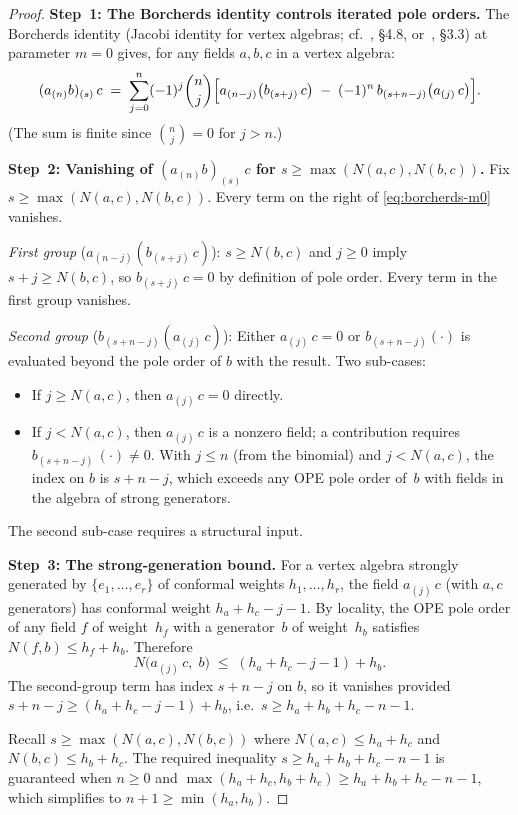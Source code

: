 \begin{proof}
\textbf{Step~1: The Borcherds identity controls iterated pole orders.}
The Borcherds identity (Jacobi identity for vertex algebras;
cf.~\cite{Kac98}, \S4.8, or~\cite{FBZ04}, \S3.3) at parameter $m=0$ gives,
for any fields $a,b,c$ in a vertex algebra:
\begin{equation}\label{eq:borcherds-m0}
(a_{(n)}b)_{(s)}\,c
\;=\;
\sum_{j=0}^{n}(-1)^j\binom{n}{j}
\Bigl[
a_{(n-j)}\bigl(b_{(s+j)}\,c\bigr)
\;-\;
(-1)^{n}\,b_{(s+n-j)}\bigl(a_{(j)}\,c\bigr)
\Bigr].
\end{equation}
(The sum is finite since $\binom{n}{j}=0$ for $j>n$.)

\smallskip
\textbf{Step~2: Vanishing of $(a_{(n)}b)_{(s)}\,c$ for
$s\ge\max(N(a,c),N(b,c))$.}
Fix $s\ge\max(N(a,c),N(b,c))$. Every term on the right of
\eqref{eq:borcherds-m0} vanishes.

\emph{First group} ($a_{(n-j)}(b_{(s+j)}\,c)$):
$s\ge N(b,c)$ and $j\ge 0$ imply $s+j\ge N(b,c)$, so
$b_{(s+j)}\,c=0$ by definition of pole order. Every term in the first
group vanishes.

\emph{Second group} ($b_{(s+n-j)}(a_{(j)}\,c)$):
Either $a_{(j)}\,c=0$ or $b_{(s+n-j)}(\cdot)$ is evaluated beyond the
pole order of $b$ with the result. Two sub-cases:
\begin{itemize}
\item If $j\ge N(a,c)$, then $a_{(j)}\,c=0$ directly.
\item If $j<N(a,c)$, then $a_{(j)}\,c$ is a nonzero field; a contribution
requires $b_{(s+n-j)}\,(\cdot)\ne 0$. With $j\le n$ (from the
binomial) and $j<N(a,c)$, the index on $b$ is $s+n-j$, which exceeds
any OPE pole order of~$b$ with fields in the algebra of strong generators.
\end{itemize}

The second sub-case requires a structural input.

\smallskip
\textbf{Step~3: The strong-generation bound.}
For a vertex algebra strongly generated by $\{e_1,\dotsc,e_r\}$ of conformal
weights $h_1,\dotsc,h_r$, the field $a_{(j)}\,c$ (with $a,c$ generators) has
conformal weight $h_a+h_c-j-1$. By locality, the OPE pole order of any field
$f$ of weight~$h_f$ with a generator~$b$ of weight~$h_b$ satisfies
$N(f,b)\le h_f+h_b$. Therefore
\[
N\bigl(a_{(j)}\,c,\;b\bigr)
\;\le\;
(h_a+h_c-j-1)+h_b.
\]
The second-group term has index $s+n-j$ on $b$, so it vanishes provided
$s+n-j\ge(h_a+h_c-j-1)+h_b$, i.e.\ $s\ge h_a+h_b+h_c-n-1$.

Recall $s\ge\max(N(a,c),N(b,c))$ where $N(a,c)\le h_a+h_c$ and
$N(b,c)\le h_b+h_c$. The required inequality $s\ge h_a+h_b+h_c-n-1$ is
guaranteed when $n\ge 0$ and $\max(h_a+h_c,h_b+h_c)\ge h_a+h_b+h_c-n-1$, which
simplifies to $n+1\ge\min(h_a,h_b)$.


\end{proof}
